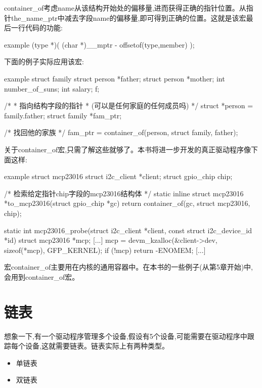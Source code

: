 \documentclass[lang=cn,newtx,10pt,scheme=chinese]{elegantbook}
\begin{document}
container\_of考虑name从该结构开始处的偏移量,进而获得正确的指针位置。从指针the\_name\_ptr中减去字段name的偏移量,即可得到正确的位置。这就是该宏最后一行代码的功能:

\begin{mycode}{example}
(type *)( (char *)__mptr - offsetof(type,member) );
\end{mycode}

下面的例子实际应用该宏:

\begin{mycode}{example}
struct family {
    struct person *father;
    struct person *mother;
    int number_of_suns;
    int salary;
} f;

/*
* 指向结构字段的指针
* (可以是任何家庭的任何成员吗)
*/
struct *person = family.father;
struct family *fam_ptr;

/* 找回他的家族 */
fam_ptr = container_of(person, struct family, father);
\end{mycode}

关于container\_of宏,只需了解这些就够了。本书将进一步开发的真正驱动程序像下面这样:

\begin{mycode}{example}
struct mcp23016 {
    struct i2c_client *client;
    struct gpio_chip chip;
}

/* 检索给定指针chip字段的mcp23016结构体 */
static inline struct mcp23016 *to_mcp23016(struct gpio_chip *gc)
{
    return container_of(gc, struct mcp23016, chip);
}

static int mcp23016_probe(struct i2c_client *client, const struct i2c_device_id *id)
{
    struct mcp23016 *mcp;
    [...]
    mcp = devm_kzalloc(&client->dev, sizeof(*mcp), GFP_KERNEL);
    if (!mcp)
        return -ENOMEM;
    [...]
}
\end{mycode}

宏container\_of主要用在内核的通用容器中。在本书的一些例子(从第5章开始)中,会用到container\_of宏。

\section{链表}

想象一下,有一个驱动程序管理多个设备,假设有5个设备,可能需要在驱动程序中跟踪每个设备,这就需要链表。链表实际上有两种类型。

\begin{itemize}
    \item 单链表
    \item 双链表
\end{itemize}
\end{document}
